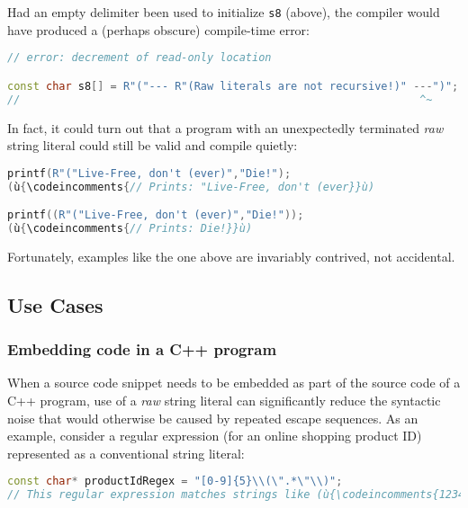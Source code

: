 \noindent Had an empty delimiter been used to initialize \texttt{s8} (above), the
compiler would have produced a (perhaps obscure) compile-time error:

\begin{lstlisting}[language=C++]
// error: decrement of read-only location

const char s8[] = R"("--- R"(Raw literals are not recursive!)" ---")";
//                                                              ^~
\end{lstlisting}

\noindent In fact, it could turn out that a program with an unexpectedly
terminated \emph{raw} string literal could still be valid and compile
quietly:

\begin{lstlisting}[language=C++]
printf(R"("Live-Free, don't (ever)","Die!");
(ù{\codeincomments{// Prints: "Live-Free, don't (ever}}ù)

printf((R"("Live-Free, don't (ever)","Die!"));
(ù{\codeincomments{// Prints: Die!}}ù)
\end{lstlisting}

\noindent Fortunately, examples like the one above are invariably contrived, not
accidental.

\subsection[Use Cases]{Use Cases}\label{use-cases}

\subsubsection[Embedding code in a C++ program]{Embedding code in a C++ program}\label{embedding-code-in-a-c++-program}

When a source code snippet needs to be embedded as part of the source
code of a C++ program, use of a \emph{raw} string literal can
significantly reduce the syntactic noise that would otherwise be caused
by repeated escape sequences. As an example, consider a regular
expression (for an online shopping product ID) represented as a
conventional string literal:

\begin{lstlisting}[language=C++]
const char* productIdRegex = "[0-9]{5}\\(\".*\"\\)";
// This regular expression matches strings like (ù{\codeincomments{12345("Product")}}ù).
\end{lstlisting}

